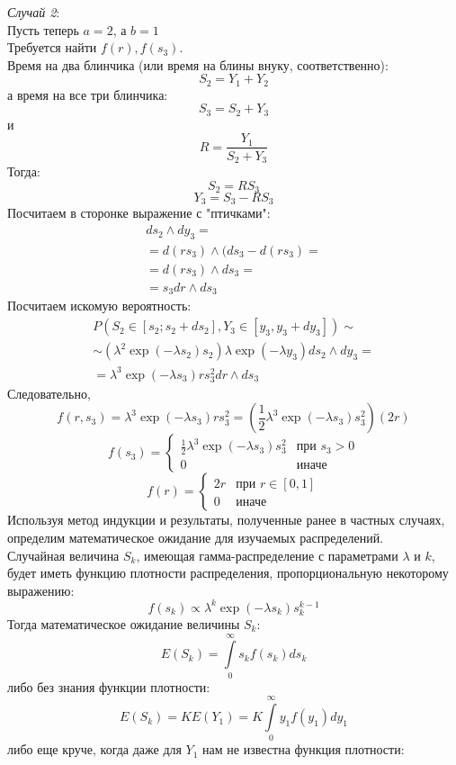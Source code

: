 \documentclass[12pt]{article} %
\theoremstyle{definition} %
\begin{document}
\textit{Случай 2}:\\
Пусть теперь $a = 2$, а $b = 1$\\
Требуется найти $f(r), f(s_3)$.\\
Время на два блинчика (или время на блины внуку, соответственно):
\[
    S_2 = Y_1 + Y_2
\]
а время на все три блинчика:
\[
    S_3 = S_2 + Y_3
\]
и
\[
    R = \frac{Y_1}{S_2 + Y_3}
\]
Тогда:
\[
    S_2 = R S_3
\]
\[
    Y_3 = S_3 - R S_3
\]
Посчитаем в сторонке выражение с "птичками":
\begin{eqnarray*}
    ds_2 \wedge dy_3 =\\
    = d(r s_3) \wedge (ds_3 - d(r s_3) =\\
    = d(r s_3) \wedge ds_3 =\\
    = s_3 dr \wedge ds_3
\end{eqnarray*}
Посчитаем искомую вероятность:
\begin{eqnarray*}
    P(S_2 \in [s_2; s_2 + ds_2], Y_3 \in [y_3, y_3 + dy_3]) \sim\\
    \sim (\lambda^2 \exp(- \lambda s_2) s_2) \lambda \exp(- \lambda y_3) ds_2 \wedge dy_3 =\\
    = \lambda^3 \exp(- \lambda s_3) r s_3^2 dr \wedge ds_3
\end{eqnarray*}
Следовательно,
\[
    f(r, s_3) = \lambda^3 \exp(- \lambda s_3) r s_3^2 = (\frac{1}{2} \lambda^3 \exp(- \lambda s_3) s_3^2) (2 r)
\]
\[
    f(s_3) =
    \begin{cases}
        \frac{1}{2} \lambda^3 \exp(- \lambda s_3) s_3^2 &\text{при $s_3 > 0$}\\
        0 &\text{иначе}
    \end{cases}
\]
\[
    f(r) =
    \begin{cases}
        2 r &\text{при $r \in [0,1]$}\\
        0 &\text{иначе}
    \end{cases}
\]
Используя метод индукции и результаты, полученные ранее в частных случаях, определим математическое ожидание для изучаемых распределений.\\
Случайная величина $S_k$, имеющая гамма-распределение с параметрами $\lambda$ и $k$, будет иметь функцию плотности распределения, пропорциональную некоторому выражению:
\[
    f(s_k) \propto \lambda^k \exp(- \lambda s_k) s_k^{k - 1}
\]
Тогда математическое ожидание величины $S_k$:
\[
    E(S_k) = \int \limits_{0}^{\infty} s_k f(s_k) ds_k
\]
либо без знания функции плотности:
\[
    E(S_k) = K E(Y_1) = K \int \limits_{0}^{\infty} y_1 f(y_1) dy_1
\]
либо еще круче, когда даже для $Y_1$ нам не известна функция плотности:
\end{document}
